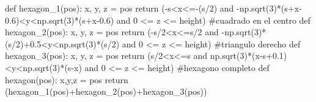 \documentclass[
  letterpaper,
  DIV=11,
  numbers=noendperiod]{scrreprt}
\newenvironment{Shaded}{\begin{snugshade}}{\end{snugshade}}
\newcommand{\CommentTok}[1]{\textcolor[rgb]{0.37,0.37,0.37}{#1}}
\newcommand{\ControlFlowTok}[1]{\textcolor[rgb]{0.00,0.23,0.31}{#1}}
\newcommand{\DecValTok}[1]{\textcolor[rgb]{0.68,0.00,0.00}{#1}}
\newcommand{\FloatTok}[1]{\textcolor[rgb]{0.68,0.00,0.00}{#1}}
\newcommand{\KeywordTok}[1]{\textcolor[rgb]{0.00,0.23,0.31}{#1}}
\newcommand{\NormalTok}[1]{\textcolor[rgb]{0.00,0.23,0.31}{#1}}
\newcommand{\OperatorTok}[1]{\textcolor[rgb]{0.37,0.37,0.37}{#1}}
\begin{document}
\begin{Shaded}
\begin{Highlighting}[]
    \KeywordTok{def}\NormalTok{ hexagon\_1(pos):}
\NormalTok{        x, y, z }\OperatorTok{=}\NormalTok{ pos }
        \ControlFlowTok{return}\NormalTok{ (}\OperatorTok{{-}}\NormalTok{s}\OperatorTok{\textless{}}\NormalTok{x}\OperatorTok{\textless{}={-}}\NormalTok{(s}\OperatorTok{/}\DecValTok{2}\NormalTok{) }\KeywordTok{and} \OperatorTok{{-}}\NormalTok{np.sqrt(}\DecValTok{3}\NormalTok{)}\OperatorTok{*}\NormalTok{(s}\OperatorTok{+}\NormalTok{x}\OperatorTok{{-}}\FloatTok{0.6}\NormalTok{)}\OperatorTok{\textless{}}\NormalTok{y}\OperatorTok{\textless{}}\NormalTok{np.sqrt(}\DecValTok{3}\NormalTok{)}\OperatorTok{*}\NormalTok{(s}\OperatorTok{+}\NormalTok{x}\OperatorTok{{-}}\FloatTok{0.6}\NormalTok{) }\KeywordTok{and} \DecValTok{0} \OperatorTok{\textless{}=}\NormalTok{ z }\OperatorTok{\textless{}=}\NormalTok{ height)}
    \CommentTok{\#cuadrado en el centro}
    \KeywordTok{def}\NormalTok{ hexagon\_2(pos):}
\NormalTok{        x, y, z }\OperatorTok{=}\NormalTok{ pos }
        \ControlFlowTok{return}\NormalTok{ (}\OperatorTok{{-}}\NormalTok{s}\OperatorTok{/}\DecValTok{2}\OperatorTok{\textless{}}\NormalTok{x}\OperatorTok{\textless{}=}\NormalTok{s}\OperatorTok{/}\DecValTok{2} \KeywordTok{and} \OperatorTok{{-}}\NormalTok{np.sqrt(}\DecValTok{3}\NormalTok{)}\OperatorTok{*}\NormalTok{(s}\OperatorTok{/}\DecValTok{2}\NormalTok{)}\OperatorTok{+}\FloatTok{0.5}\OperatorTok{\textless{}}\NormalTok{y}\OperatorTok{\textless{}}\NormalTok{np.sqrt(}\DecValTok{3}\NormalTok{)}\OperatorTok{*}\NormalTok{(s}\OperatorTok{/}\DecValTok{2}\NormalTok{) }\KeywordTok{and} \DecValTok{0} \OperatorTok{\textless{}=}\NormalTok{ z }\OperatorTok{\textless{}=}\NormalTok{ height)}
    \CommentTok{\#triangulo derecho }
    \KeywordTok{def}\NormalTok{ hexagon\_3(pos):}
\NormalTok{        x, y, z }\OperatorTok{=}\NormalTok{ pos }
        \ControlFlowTok{return}\NormalTok{ (s}\OperatorTok{/}\DecValTok{2}\OperatorTok{\textless{}}\NormalTok{x}\OperatorTok{\textless{}=}\NormalTok{s }\KeywordTok{and}\NormalTok{ np.sqrt(}\DecValTok{3}\NormalTok{)}\OperatorTok{*}\NormalTok{(x}\OperatorTok{{-}}\NormalTok{s}\OperatorTok{+}\FloatTok{0.1}\NormalTok{)}\OperatorTok{\textless{}}\NormalTok{y}\OperatorTok{\textless{}}\NormalTok{np.sqrt(}\DecValTok{3}\NormalTok{)}\OperatorTok{*}\NormalTok{(s}\OperatorTok{{-}}\NormalTok{x) }\KeywordTok{and} \DecValTok{0} \OperatorTok{\textless{}=}\NormalTok{ z }\OperatorTok{\textless{}=}\NormalTok{ height)}
    \CommentTok{\#hexagono completo }
    \KeywordTok{def}\NormalTok{ hexagon(pos):}
\NormalTok{        x,y,z }\OperatorTok{=}\NormalTok{ pos }
        \ControlFlowTok{return}\NormalTok{ (hexagon\_1(pos)}\OperatorTok{+}\NormalTok{hexagon\_2(pos)}\OperatorTok{+}\NormalTok{hexagon\_3(pos))}


\end{Highlighting}
\end{Shaded}
\end{document}
